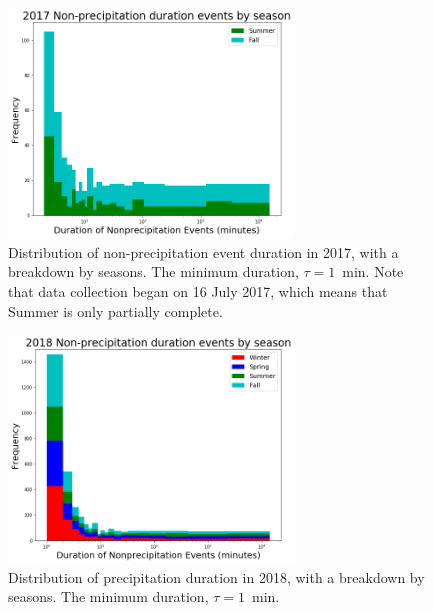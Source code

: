 \documentclass[11pt]{report}
\begin{document}
\clearpage

\begin{figure}[t]
	\centering
	\includegraphics[width=0.675\textwidth]{Figures/nonprecip_2017.png}
	\caption[Histogram of non-precipitation events for 2017 broken down by
	season]{\label{np2017} Distribution of non-precipitation event duration in	2017, with a breakdown by seasons. The minimum duration, $\tau = 1$~min. Note that data collection began on 16 July 2017, which means that Summer is only partially complete.}
\end{figure}
\begin{figure}[b]
	\centering
	\includegraphics[width=0.675\textwidth]{Figures/nonprecip_2018.png}
	\caption[Histogram of non-precipitation events for 2018 broken down by season]{\label{np2018}
		Distribution of precipitation duration in 2018, with a breakdown
		by seasons. The minimum duration, $\tau=1$~min. }
\end{figure}
\end{document}
